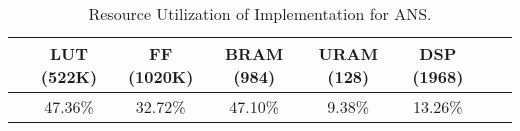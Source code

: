 \begin{scriptsize}
\begin{table}
    \caption{
        Resource Utilization of Implementation for ANS.
    }
    \label{tab:imple_result}
    \resizebox{0.9\columnwidth}{!}
    {
    \setlength{\tabcolsep}{3pt}
    \begin{tabular}{cccccccc}
    \toprule
         & \multicolumn{1}{c}{LUT (522K)} 
         & \multicolumn{1}{c}{FF (1020K)} 
         & \multicolumn{1}{c}{BRAM (984)} 
        & \multicolumn{1}{c}{URAM (128)} 
        & \multicolumn{1}{c}{DSP (1968)}  \\
         \midrule
        & 47.36\% & 32.72\% &47.10\%  & 9.38\%  & 13.26\% \\
        \bottomrule
    \end{tabular}
    }%
\end{table}
\end{scriptsize}